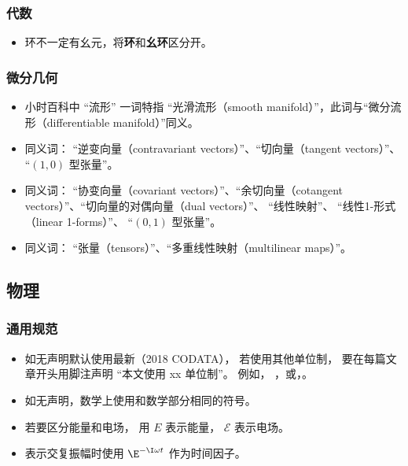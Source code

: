 \subsubsection{代数}
\begin{itemize}
\item 环不一定有幺元，将\textbf{环}和\textbf{幺环}区分开。
\end{itemize}


\subsubsection{微分几何}
\begin{itemize}
\item 小时百科中 “流形” 一词特指 “光滑流形（smooth manifold）”，此词与“微分流形（differentiable manifold）”同义。
\item 同义词： “逆变向量（contravariant vectors）”、“切向量（tangent vectors）”、 “$(1, 0)$ 型张量”。
\item 同义词： “协变向量（covariant vectors）”、“余切向量（cotangent vectors）”、“切向量的对偶向量（dual vectors）”、 “线性映射”、 “线性1-形式（linear 1-forms）”、 “$(0, 1)$ 型张量”。
\item 同义词： “张量（tensors）”、“多重线性映射（multilinear maps）”。
\end{itemize}

\subsection{物理}
\subsubsection{通用规范}
\begin{itemize}
\item 如无声明默认使用最新（2018 CODATA）， 若使用其他单位制， 要在每篇文章开头用脚注声明 “本文使用 xx 单位制”。 例如， ，或，。
\item 如无声明，数学上使用和数学部分相同的符号。
\item 若要区分能量和电场， 用 $E$ 表示能量， $\mathcal E$ 表示电场。
\item 表示交复振幅时使用 $\E^{-\I \omega t}$ 作为时间因子。
\end{itemize}

